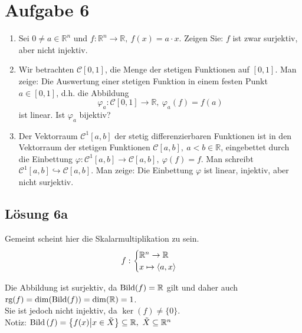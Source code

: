 \documentclass[main.tex]{subfiles}
\begin{document}
\section{Aufgabe 6}

\begin{enumerate}
    \item Sei $0\neq a\in \mathbb{R}^{n}$ und $f:\mathbb{R}^{n}\rightarrow \mathbb{R} ,\ f( x) =a\cdotp x$. Zeigen Sie: $f$ ist zwar surjektiv, aber nicht injektiv.
    \item Wir betrachten $\mathcal{C}[ 0,1]$, die Menge der stetigen Funktionen auf $[ 0,1]$. Man zeige: Die Auswertung einer stetigen Funktion in einem festen Punkt $a\in [ 0,1]$, d.h. die Abbildung
        \begin{equation*}
            \varphi _{a} :\mathcal{C}[ 0,1]\rightarrow \mathbb{R} ,\ \varphi _{a}( f) =f( a)
        \end{equation*}
        ist linear. Ist $\varphi _{a}$ bijektiv?
    \item Der Vektorraum $\mathcal{C}^{1}[ a,b]$ der stetig differenzierbaren Funktionen ist in den Vektorraum der stetigen Funktionen $\mathcal{C}[ a,b] ,\ a< b\in \mathbb{R}$, eingebettet durch die Einbettung $\varphi :\mathcal{C}^{1}[ a,b]\rightarrow \mathcal{C}[ a,b] ,\ \varphi ( f) =f.$ Man schreibt $\mathcal{C}^{1}[ a,b] \hookrightarrow \mathcal{C}[ a,b] .$ Man zeige: Die Einbettung $\varphi $ ist linear, injektiv, aber nicht surjektiv.
\end{enumerate}

\subsection{Lösung 6a}
Gemeint scheint hier die Skalarmultiplikation zu sein.
$$
f:\begin{cases}
    \mathbb{R}^{n}\to \mathbb{R}\\
    x \mapsto \langle a,x\rangle
\end{cases}
$$

Die Abbildung ist surjektiv, da $\operatorname{Bild}(f) =\mathbb{R}$ gilt und daher auch $\text{rg}(f) =\dim(\operatorname{Bild}(f)) =\dim(\mathbb{R}) =1$.\\

Sie ist jedoch nicht injektiv, da $\ker( f) \neq \{0\}$.\\

Notiz: $\operatorname{Bild}\left(f\right) =\left\{f( x)\middle| x\in \tilde{X}\right\} \subseteq \mathbb{R} ,\ \tilde{X} \subseteq \mathbb{R}^{n}$
\end{document}
